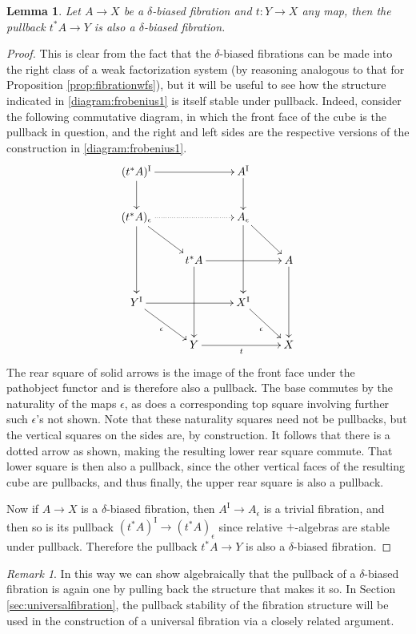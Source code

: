 \documentclass[11pt]{amsart}
\newcommand{\ra}{\ensuremath{\rightarrow}}
\renewcommand{\to}{\ensuremath{\rightarrow}}
\newcommand{\I}{\ensuremath{\mathrm{I}}}
\newtheorem{lemma}[theorem]{Lemma}
\theoremstyle{remark}
\newtheorem{remark}[theorem]{Remark}
\theoremstyle{definition}
\begin{document}
\begin{lemma}\label{lemma:fibrationspullback}
Let  $A \ra X$ be a $\delta$-biased fibration and $t: Y\ra X$ any map, then the pullback $t^*A \ra Y$ is also a $\delta$-biased  fibration.
\end{lemma}
\begin{proof}
This is clear from the fact that the $\delta$-biased fibrations can be made into the right class of a weak factorization system (by reasoning analogous to that for Proposition \ref{prop:fibrationwfs}), but it will be useful to see how the structure indicated in \eqref{diagram:frobenius1} is itself stable under pullback.  Indeed, consider the following commutative diagram, in which the front face of the cube is the pullback in question, and the right and left sides are the respective versions of the construction in \eqref{diagram:frobenius1}.
%
\begin{equation}\label{diagram:fibrationspullback}
\xymatrix{
 (t^*A)^\I \ar[rr] \ar[d] && A^\I \ar[d] & \\
  (t^*A)_\epsilon \ar[dd] \ar[rd] \ar@{.>}[rr] && A_\epsilon \ar[dd] \ar[rd] & \\
  & t^*A \ar[rr] \ar[dd]  && A \ar[dd]  \\
Y^\I \ar[rd]_\epsilon \ar[rr] & &  X^\I \ar[rd]_\epsilon & \\
 & Y \ar[rr]_t && X 
 }
\end{equation}
%
The rear square of solid arrows is the image of the front face under the pathobject functor and is therefore also a pullback. The base commutes by the naturality of the maps $\epsilon$, as does a corresponding top square involving further such $\epsilon$'s not shown.  Note that these naturality squares need not be pullbacks, but the vertical squares on the sides are, by construction.  It follows that there is a dotted arrow as shown, making the resulting lower rear square commute.  That lower square is then also a pullback, since the other vertical faces of the resulting cube are pullbacks, and thus finally, the upper rear square is also a pullback.  

Now if $A\to X$ is a $\delta$-biased fibration, then $A^\I \to A_\epsilon$ is a trivial fibration, and then so is its pullback $(t^*A)^\I \to (t^*A)_\epsilon$ since relative $+$-algebras are stable under pullback.  Therefore the pullback $t^*A\to Y$ is also a $\delta$-biased fibration.
\end{proof}

\begin{remark}
In this way we can show algebraically that the pullback of a $\delta$-biased fibration is again one by pulling back the structure that makes it so.  In Section \ref{sec:universalfibration}, the pullback stability of the fibration structure will be used in the construction of a universal fibration via a closely related argument.
\end{remark}
\end{document}
